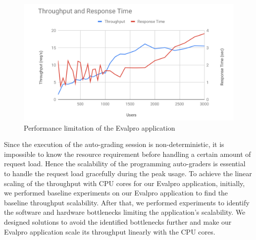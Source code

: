\documentclass{iitbreport}
\begin{document}
\begin{figure}[!htb]
            \centering
            \includegraphics[width=\linewidth]{Images/Performance_limitation.png}
            \caption{Performance limitation of the Evalpro application \cite{anshul_mtp_thesis}}
            \label{perf_evalpro_limit}
\end{figure}

Since the execution of the auto-grading session is non-deterministic, it is impossible to know the resource requirement before handling a certain amount of request load. Hence the scalability of the programming auto-graders is essential to handle the request load gracefully during the peak usage. To achieve the linear scaling of the throughput with CPU cores for our Evalpro application, initially, we performed baseline experiments on our Evalpro application to find the baseline throughput scalability. After that, we performed experiments to identify the software and hardware bottlenecks limiting the application's scalability. We designed solutions to avoid the identified bottlenecks further and make our Evalpro application scale its throughput linearly with the CPU cores.
\end{document}
